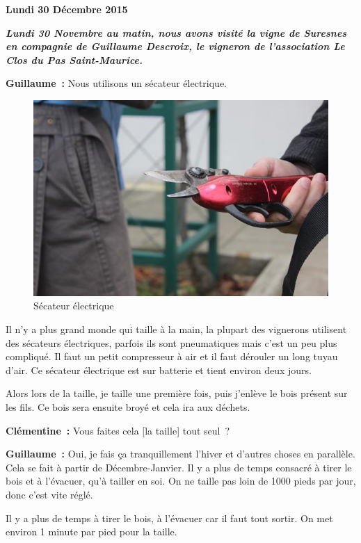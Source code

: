 \documentclass[a4paper, titlepage]{report}
\begin{document}
\textbf{Lundi 30 Décembre 2015}

\textit{\textbf{Lundi 30 Novembre au matin, nous avons visité la vigne de Suresnes en compagnie de Guillaume Descroix, le vigneron de l'association Le Clos du Pas Saint-Maurice.}}

\textbf{Guillaume~:} Nous utilisons
un sécateur électrique. 

\begin{figure}[!h]
\includegraphics{Images/taille.jpg}
\caption{Sécateur électrique}
\end{figure}

Il n'y a plus grand monde qui taille
à la main, la plupart des vignerons utilisent des sécateurs électriques,
parfois ils sont pneumatiques mais c'est un peu plus compliqué. Il faut
un petit compresseur à air et il faut dérouler un long tuyau d'air. Ce
sécateur électrique est sur batterie et tient environ deux jours.

Alors lors de la taille, je taille une première fois, puis j'enlève le
bois présent sur les fils. Ce bois sera ensuite broyé et cela ira aux
déchets.

\textbf{Clémentine~:} Vous faites cela {[}la taille{]} tout seul~?

\textbf{Guillaume~:} Oui, je fais ça tranquillement l'hiver et d'autres
choses en parallèle. Cela se fait à partir de Décembre-Janvier. Il y a
plus de temps consacré à tirer le bois et à l'évacuer, qu'à tailler en
soi. On ne taille pas loin de 1000 pieds par jour, donc c'est vite
réglé.

Il y a plus de temps à tirer le bois, à l'évacuer car il faut tout
sortir. On met environ 1 minute par pied pour la taille.
\end{document}
